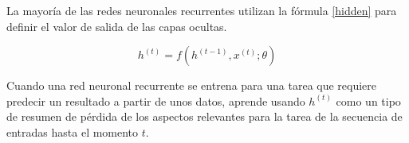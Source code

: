 \vspace{0.5cm}

La mayoría de las redes neuronales recurrentes utilizan la fórmula \ref{hidden} para definir el valor de salida de las capas ocultas. 

\begin{equation}\label{hidden}
	h^{(t)} = f(h^{(t-1)}, x^{(t)}; \theta)
\end{equation} 
	
Cuando una red neuronal recurrente se entrena para una tarea que requiere predecir un resultado a partir de unos datos, aprende usando $h^{(t)}$ como un tipo de resumen de pérdida de los aspectos relevantes para la tarea de la secuencia de entradas hasta el momento $t$. 

\vspace{0.5cm}

